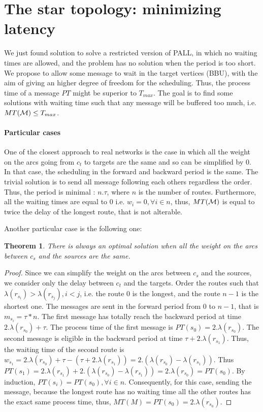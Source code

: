 \documentclass[a4paper,10pt]{article}
\newtheorem{theorem}{Theorem}
\begin{document}
   \section{The star topology: minimizing latency}\label{sec:PALL}
    
    
	  We just found solution to solve a restricted version of PALL, in which no waiting times are allowed, 
	  and the problem has no solution when the period is too short. We propose to allow some message to wait in the target vertices (BBU), with the aim of giving an higher degree of freedom for the scheduling. Thus, the process time of a message $PT$ might be superior to $T_{max}$. The goal is to find some solutions with waiting time such that any message will be buffered too much, i.e. $MT({\cal M}) \leq T_{max}$.
	   


	\paragraph{Particular cases}
		
	One of the closest approach to real networks is the case in which all the weight on the arcs going from $c_t$ to targets are the same and so can be simplified by 0. In that case, the scheduling in the forward and backward period is the same. The trivial solution is to send all message following each others regardless the order. Thus, the period is minimal : $n.\tau$, where $n$ is the number of routes. Furthermore, all the waiting times are equal to 0 i.e. $w_i = 0,\forall i \in n$, thus, $MT({\cal M})$ is equal to twice the delay of the longest route, that is not alterable.

	Another particular case is the following one:	
	 \begin{theorem}
      There is always an optimal solution when all the weight on the arcs between $c_s$ and the sources are the same.
      \end{theorem}
      \begin{proof}
      

	Since we can simplify the weight on the arcs between $c_s$ and the sources, we consider only the delay between $c_t$ and the targets. Order the routes such that $\lambda(r_{s_i}) > \lambda(r_{s_j}), i<j$, i.e. the route 0 is the longest, and the route $n-1$ is the shortest one.
	The messages are sent in the forward period from 0 to $n-1$, that is $m_{s_i} = \tau * n$.
	The first message has totally reach the backward period at time $2.\lambda(r_{s_0})+\tau$. The process time of the first message is $PT(s_0) = 2.\lambda(r_{s_0}) $.
	The second message is eligible in the backward period at time $\tau + 2.\lambda(r_{s_1})$. Thus, the waiting time of the second route is $w_{s_1} = 2.\lambda(r_{s_0})+\tau - (\tau + 2.\lambda(r_{s_1})) = 2.(\lambda(r_{s_0}) - \lambda(r_{s_1}))$. Thus $PT(s_1) = 2.\lambda(r_{s_1}) + 2.(\lambda(r_{s_0}) - \lambda(r_{s_1}))  = 2.\lambda(r_{s_0})  = PT(s_0)$.
	By induction, $PT(s_i) = PT(s_0), \forall i \in n$. 
	Consequently, for this case, sending the message, because the longest route has no waiting time all the other routes has the exact same process time, thus, $MT(M) = PT(s_0) = 2.\lambda(r_{s_0}) $.
     \end{proof}
\end{document}
